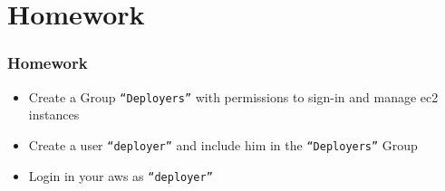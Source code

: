\documentclass{beamer}
\begin{document}
\section{Homework}
\begin{frame}[fragile]
\frametitle{Homework}
\begin{itemize}
\item Create a Group \texttt{``Deployers''} with permissions to sign-in and manage \acrshort{ec2} instances
\item Create a user \texttt{``deployer''} and include him in the \texttt{``Deployers''} Group
\item Login in your \acrshort{aws} as \texttt{``deployer''}
\end{itemize}
\end{frame}


\end{document}
